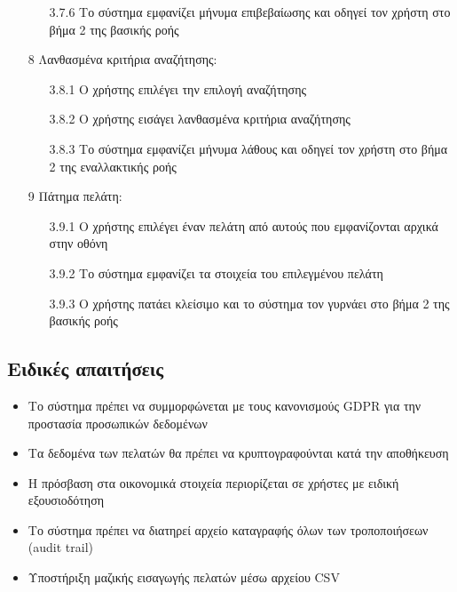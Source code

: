 \documentclass[12pt,a4paper,twoside]{book}
\begin{document}
\begin{enumerate}
\begin{enumerate}
          \item [3.7.6 ] Το σύστημα εμφανίζει μήνυμα επιβεβαίωσης και οδηγεί τον χρήστη στο βήμα 2 της βασικής ροής %
        \end{enumerate}
  \item[8 ] Λανθασμένα κριτήρια αναζήτησης:
        \begin{enumerate}
          \item [3.8.1 ] Ο χρήστης επιλέγει την επιλογή αναζήτησης
          \item [3.8.2 ] Ο χρήστης εισάγει λανθασμένα κριτήρια αναζήτησης
          \item [3.8.3 ] Το σύστημα εμφανίζει μήνυμα λάθους και οδηγεί τον χρήστη στο βήμα 2 της εναλλακτικής ροής %
        \end{enumerate}
  \item[9 ] Πάτημα πελάτη:
        \begin{enumerate}
          \item [3.9.1 ] Ο χρήστης επιλέγει έναν πελάτη από αυτούς που εμφανίζονται αρχικά στην οθόνη
          \item [3.9.2 ] Το σύστημα εμφανίζει τα στοιχεία του επιλεγμένου πελάτη
          \item [3.9.3 ] Ο χρήστης πατάει κλείσιμο και το σύστημα τον γυρνάει στο βήμα 2 της βασικής ροής
        \end{enumerate}
\end{enumerate}

\subsection{Ειδικές απαιτήσεις} %
\begin{itemize}
  \item Το σύστημα πρέπει να συμμορφώνεται με τους κανονισμούς GDPR για την προστασία προσωπικών δεδομένων %
  \item Τα δεδομένα των πελατών θα πρέπει να κρυπτογραφούνται κατά την αποθήκευση %
  \item Η πρόσβαση στα οικονομικά στοιχεία περιορίζεται σε χρήστες με ειδική εξουσιοδότηση %
  \item Το σύστημα πρέπει να διατηρεί αρχείο καταγραφής όλων των τροποποιήσεων (audit trail) %
  \item Υποστήριξη μαζικής εισαγωγής πελατών μέσω αρχείου CSV
\end{itemize}
\end{document}
